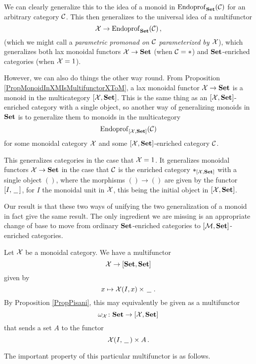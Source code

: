 \documentclass{article}
\begin{document}
We can clearly generalize this to the idea of a monoid in $\operatorname{Endoprof}_{\normalfont\textbf{Set}}({\mathcal{C}})$ for an arbitrary category ${\mathcal{C}}$.  
This then generalizes to the universal idea of a multifunctor
\[
  \mathcal X \to \operatorname{Endoprof}_{\normalfont\textbf{Set}}({\mathcal{C}})\,,
  \]
(which we might call a \emph{parametric promonad on ${\mathcal{C}}$ parameterized by $\mathcal X$}), which generalizes both lax monoidal functors $\mathcal X \to {\normalfont\textbf{Set}}$ (when ${\mathcal{C}}=*$) and ${\normalfont\textbf{Set}}$-enriched categories (when $\mathcal X=1$).

However, we can also do things the other way round.  
From Proposition \ref{PropMonoidInXMIsMultifunctorXToM}, a lax monoidal functor $\mathcal X \to {\normalfont\textbf{Set}}$ is a monoid in the multicategory $[\mathcal X,{\normalfont\textbf{Set}}]$.  
This is the same thing as an $[\mathcal X,{\normalfont\textbf{Set}}]$-enriched category with a single object, so another way of generalizing monoids in ${\normalfont\textbf{Set}}$ is to generalize them to monoids in the multicategory
\[
  \operatorname{Endoprof}_{[\mathcal X,{\normalfont\textbf{Set}}]}({\mathcal{C}})
  \]
for some monoidal category $\mathcal X$ and some $[\mathcal X,{\normalfont\textbf{Set}}]$-enriched category ${\mathcal{C}}$.

This generalizes categories in the case that $\mathcal X=1$.  
It generalizes monoidal functors $\mathcal X \to {\normalfont\textbf{Set}}$ in the case that ${\mathcal{C}}$ is the enriched category $*_{[\mathcal X,{\normalfont\textbf{Set}}]}$ with a single object $()$, where the morphisms $() \to ()$ are given by the functor $[I,\,\underline{\hspace{1.5ex}}\,]$, for $I$ the monoidal unit in $\mathcal X$, this being the initial object in $[\mathcal X,{\normalfont\textbf{Set}}]$.

Our result is that these two ways of unifying the two generalization of a monoid in fact give the same result.  
The only ingredient we are missing is an appropriate change of base to move from ordinary ${\normalfont\textbf{Set}}$-enriched categories to $[\mathcal M,{\normalfont\textbf{Set}}]$-enriched categories.

\begin{definition}
  Let $\mathcal X$ be a monoidal category.  
  We have a multifunctor
  \[
    \mathcal X \to [{\normalfont\textbf{Set}},{\normalfont\textbf{Set}}]
    \]
  given by
  \[
    x \mapsto \mathcal X(I,x) \times \,\underline{\hspace{1.5ex}}\,\,.
    \]
  By Proposition \ref{PropPisani}, this may equivalently be given as a multifunctor
  \[
    \omega_\mathcal X\colon{\normalfont\textbf{Set}} \to [\mathcal X,{\normalfont\textbf{Set}}]
    \]
  that sends a set $A$ to the functor
  \[
    \mathcal X(I,\,\underline{\hspace{1.5ex}}\,)\times A\,.
    \]
\end{definition}

The important property of this particular multifunctor is as follows.
\end{document}

